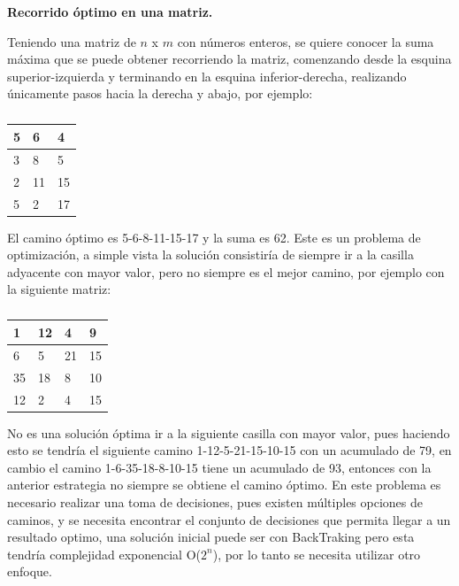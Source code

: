 \documentclass[12pt, a4paper]{article}
\newcommand{\subtitulo}[1]{\begin{center}\textbf{#1}\end{center}}
\begin{document}
	\subtitulo{Recorrido óptimo en una matriz.}
	
	Teniendo una matriz de $n$ x $m$ con números enteros, se quiere conocer la suma máxima que se puede obtener
	recorriendo la matriz, comenzando desde la esquina superior-izquierda y terminando en la esquina inferior-derecha,
	realizando únicamente pasos hacia la derecha y abajo, por ejemplo:\\
	\begin{table}[h]
		\centering
		\begin{tabular}{|l|l|l|}
			\hline
			5  &6 &4 \\ \hline
			3  &8  &5 \\ \hline
			2 &11 &15 \\ \hline
			5 &2  &17 \\ \hline
		\end{tabular}
		\caption{}
		\label{dp:introduccion:recorrido_matriz1}
	\end{table}
	
	El camino óptimo es 5-6-8-11-15-17 y la suma es 62. Este es un problema de optimización, a simple vista la solución 
	consistiría de siempre ir a la casilla adyacente con mayor valor, pero no siempre es el mejor camino, por ejemplo  
	con la siguiente matriz:
	\begin{table}[H]
		\centering
		\begin{tabular}{|l|l|l|l|}
		 	\hline
			1  & 12 & 4  & 9 \\ \hline
			6  & 5  & 21 & 15 \\ \hline
			35 & 18 & 8  & 10 \\ \hline
			12 & 2  & 4  & 15 \\ \hline
		\end{tabular}
		\caption{}
		\label{dp:introduccion:recorrido_matriz_2}
	\end{table}
	
	No es una solución óptima ir a la siguiente casilla con mayor valor, pues haciendo esto se tendría el siguiente
	camino 1-12-5-21-15-10-15 con un acumulado de 79, en cambio el camino 1-6-35-18-8-10-15 tiene un acumulado de 93,
	entonces con la anterior estrategia no siempre se obtiene el camino óptimo. En este problema es necesario realizar
	una toma de decisiones, pues existen múltiples opciones de caminos, y se necesita encontrar el conjunto de
	decisiones que permita llegar a un resultado optimo, una solución inicial puede ser con BackTraking pero esta 
	tendría complejidad exponencial O($2^{n}$), por lo tanto se necesita utilizar otro enfoque.\\
	
\end{document}
